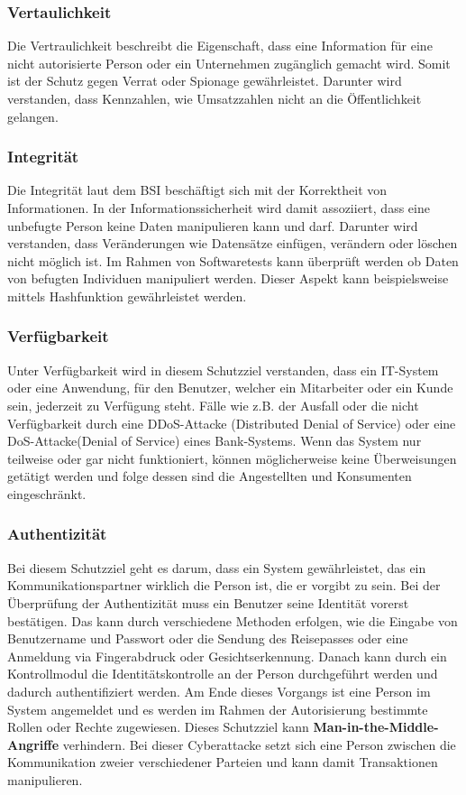 \subsubsection{Vertaulichkeit}
Die Vertraulichkeit beschreibt die Eigenschaft, dass eine Information für eine nicht autorisierte Person oder ein Unternehmen zugänglich gemacht wird. Somit ist der Schutz gegen Verrat oder Spionage gewährleistet. Darunter wird verstanden, dass Kennzahlen, wie Umsatzzahlen nicht an die Öffentlichkeit gelangen. 


\subsubsection{Integrität}
Die Integrität laut dem BSI beschäftigt sich mit der Korrektheit von Informationen. In der Informationssicherheit wird damit assoziiert, dass eine unbefugte Person keine Daten manipulieren kann und darf. Darunter wird verstanden, dass Veränderungen wie Datensätze einfügen, verändern oder löschen nicht möglich ist.
Im Rahmen von Softwaretests kann überprüft werden ob Daten von befugten Individuen manipuliert werden. Dieser Aspekt kann beispielsweise mittels Hashfunktion gewährleistet werden.


\subsubsection{Verfügbarkeit}
Unter Verfügbarkeit wird in diesem Schutzziel verstanden, dass ein IT-System oder eine Anwendung, für den Benutzer, welcher ein Mitarbeiter oder ein Kunde sein, jederzeit zu Verfügung steht. Fälle wie z.B. der Ausfall oder die nicht Verfügbarkeit durch eine DDoS-Attacke (Distributed Denial of Service) oder eine DoS-Attacke(Denial of Service) eines Bank-Systems. Wenn das System nur teilweise oder gar nicht funktioniert, können möglicherweise keine Überweisungen getätigt werden und folge dessen sind die Angestellten und Konsumenten eingeschränkt. 

\subsubsection{Authentizität}
Bei diesem Schutzziel geht es darum, dass ein System gewährleistet, das ein Kommunikationspartner wirklich die Person ist, die er vorgibt zu sein. Bei der Überprüfung der Authentizität muss ein Benutzer seine Identität vorerst bestätigen. Das kann durch verschiedene Methoden erfolgen, wie die Eingabe von Benutzername und Passwort oder die Sendung des Reisepasses oder eine Anmeldung via Fingerabdruck oder Gesichtserkennung. Danach kann durch ein Kontrollmodul die Identitätskontrolle an der Person durchgeführt werden und dadurch authentifiziert werden. Am Ende dieses Vorgangs ist eine Person im System angemeldet und es werden im Rahmen der Autorisierung bestimmte Rollen oder Rechte zugewiesen.
Dieses Schutzziel kann \textbf{Man-in-the-Middle-Angriffe} verhindern. Bei dieser Cyberattacke setzt sich eine Person zwischen die Kommunikation zweier verschiedener Parteien und kann damit Transaktionen manipulieren. 

